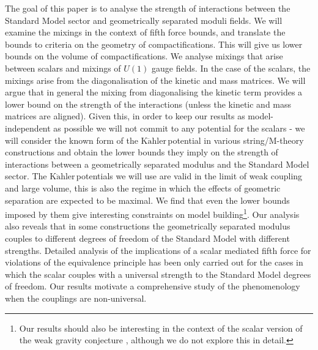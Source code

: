 \documentclass[11pt,a4paper]{article}
\newcommand{\Kahler}{\ensuremath{\text{K}\ddot{\text{a}}\text{hler}\,}}
\begin{document}
The goal of this paper is to analyse the strength of interactions between the Standard Model sector and geometrically separated moduli fields. We will examine the mixings in the context of fifth force bounds, and  translate the bounds to criteria on the geometry of  compactifications. This will give us lower bounds on the volume of compactifications. We analyse mixings that arise between scalars and mixings of $U(1)$ gauge fields. In the case of the scalars, the mixings arise from the diagonalisation of the kinetic and mass matrices. We will argue that in general the mixing from diagonalising the kinetic term provides a lower bound on the strength of the interactions (unless the kinetic and mass matrices are aligned). Given this, in order to keep our results as model-independent as possible we will not commit to any potential for the scalars - we will consider the known form of the \Kahler potential in various string/M-theory constructions and obtain the lower bounds they imply on the strength of interactions between a geometrically separated modulus and the Standard Model sector. The \Kahler potentials we will use are valid in the limit of weak coupling and large volume, this is also the regime in which the effects of geometric separation are expected to be maximal. We find that even the lower bounds imposed by them give interesting constraints on  model building\footnote{Our results should also be interesting in the context of the scalar version of the weak gravity conjecture \cite{Palti:2017elp}, although we do not explore this in detail.}. Our analysis also reveals that in some constructions the geometrically separated modulus couples to different degrees of freedom of the Standard Model
with different strengths. Detailed analysis of the implications of a scalar mediated  fifth force for violations of the equivalence principle has been only carried out for the cases in which the scalar couples with a universal strength to the Standard Model degrees of freedom. Our results motivate a comprehensive study of the phenomenology when the couplings are non-universal.
\end{document}
